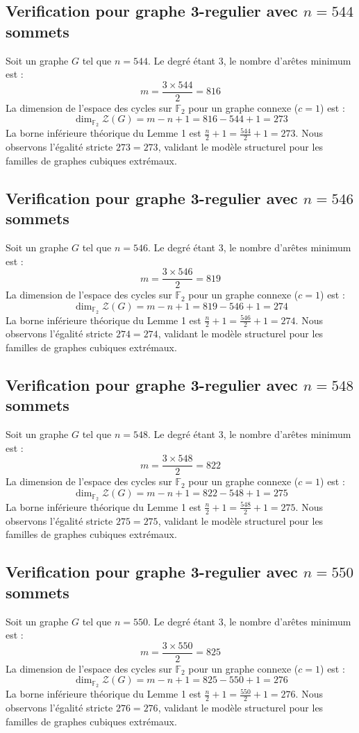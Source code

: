 \documentclass[11pt,a4paper]{article}
\begin{document}
\subsection{Verification pour graphe 3-regulier avec $n=544$ sommets}
Soit un graphe $G$ tel que $n = 544$. Le degré étant 3, le nombre d'arêtes minimum est :
$$ m = \frac{3 \times 544}{2} = 816 $$
La dimension de l'espace des cycles sur $\mathbb{F}_2$ pour un graphe connexe ($c=1$) est :
$$ \dim_{\mathbb{F}_2} \mathcal{Z}(G) = m - n + 1 = 816 - 544 + 1 = 273 $$
La borne inférieure théorique du Lemme 1 est $\frac{n}{2} + 1 = \frac{544}{2} + 1 = 273$.
Nous observons l'égalité stricte $273 = 273$, validant le modèle structurel pour les familles de graphes cubiques extrémaux.

\subsection{Verification pour graphe 3-regulier avec $n=546$ sommets}
Soit un graphe $G$ tel que $n = 546$. Le degré étant 3, le nombre d'arêtes minimum est :
$$ m = \frac{3 \times 546}{2} = 819 $$
La dimension de l'espace des cycles sur $\mathbb{F}_2$ pour un graphe connexe ($c=1$) est :
$$ \dim_{\mathbb{F}_2} \mathcal{Z}(G) = m - n + 1 = 819 - 546 + 1 = 274 $$
La borne inférieure théorique du Lemme 1 est $\frac{n}{2} + 1 = \frac{546}{2} + 1 = 274$.
Nous observons l'égalité stricte $274 = 274$, validant le modèle structurel pour les familles de graphes cubiques extrémaux.

\subsection{Verification pour graphe 3-regulier avec $n=548$ sommets}
Soit un graphe $G$ tel que $n = 548$. Le degré étant 3, le nombre d'arêtes minimum est :
$$ m = \frac{3 \times 548}{2} = 822 $$
La dimension de l'espace des cycles sur $\mathbb{F}_2$ pour un graphe connexe ($c=1$) est :
$$ \dim_{\mathbb{F}_2} \mathcal{Z}(G) = m - n + 1 = 822 - 548 + 1 = 275 $$
La borne inférieure théorique du Lemme 1 est $\frac{n}{2} + 1 = \frac{548}{2} + 1 = 275$.
Nous observons l'égalité stricte $275 = 275$, validant le modèle structurel pour les familles de graphes cubiques extrémaux.

\subsection{Verification pour graphe 3-regulier avec $n=550$ sommets}
Soit un graphe $G$ tel que $n = 550$. Le degré étant 3, le nombre d'arêtes minimum est :
$$ m = \frac{3 \times 550}{2} = 825 $$
La dimension de l'espace des cycles sur $\mathbb{F}_2$ pour un graphe connexe ($c=1$) est :
$$ \dim_{\mathbb{F}_2} \mathcal{Z}(G) = m - n + 1 = 825 - 550 + 1 = 276 $$
La borne inférieure théorique du Lemme 1 est $\frac{n}{2} + 1 = \frac{550}{2} + 1 = 276$.
Nous observons l'égalité stricte $276 = 276$, validant le modèle structurel pour les familles de graphes cubiques extrémaux.
\end{document}
